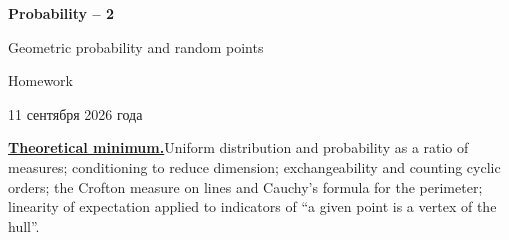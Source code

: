 \documentclass[11pt,a4paper]{article}
\begin{document}
\begin{center}
{\huge\bfseries Probability -- 2\par}\vspace{1.07em}
{\Large Geometric probability and random points\par}\vspace{1.1em}
{\Large Homework\par}\vspace{1.1em}
{\foreignlanguage{russian}{11 сентября 2026 года}\par}
\end{center}\vspace{0pt}

\noindent\textbf{\underline{Theoretical minimum.}}\quad Uniform distribution and probability as a ratio
of measures; conditioning to reduce dimension; exchangeability and counting cyclic orders; the
Crofton measure on lines and Cauchy's formula for the perimeter; linearity of expectation applied to
indicators of ``a given point is a vertex of the hull''.
\end{document}
